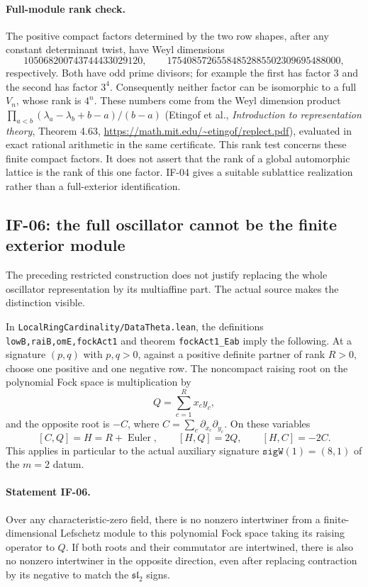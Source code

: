 \paragraph{Full-module rank check.}
The positive compact factors determined by the two row shapes, after
any constant determinant twist, have Weyl dimensions
\[
 105068200743744433029120,
 \qquad17540857265584852885502309695488000,
\]
respectively. Both have odd prime divisors; for example the first has
factor $3$ and the second has factor $3^4$. Consequently neither factor
can be isomorphic to a full $V_n$, whose rank is $4^n$. These numbers
come from the Weyl dimension product
$\prod_{a<b}(\lambda_a-\lambda_b+b-a)/(b-a)$ (Etingof et al.,
\emph{Introduction to representation theory}, Theorem 4.63,
\url{https://math.mit.edu/~etingof/replect.pdf}), evaluated in exact
rational arithmetic in the same certificate. This rank test concerns
these finite compact factors. It does not assert that the rank of a
global automorphic lattice is the rank of this one factor. IF-04 gives
a suitable sublattice realization rather than a full-exterior
identification.

\subsection{IF-06: the full oscillator cannot be the finite exterior module}
The preceding restricted construction does not justify replacing the
whole oscillator representation by its multiaffine part. The actual
source makes the distinction visible.

In \texttt{LocalRingCardinality/DataTheta.lean}, the definitions
\texttt{lowB,raiB,omE,fockAct1} and theorem
\texttt{fockAct1\_Eab} imply the following. At a signature $(p,q)$ with
$p,q>0$, against a positive definite partner of rank $R>0$, choose one
positive and one negative row. The noncompact raising root on the
polynomial Fock space is multiplication by
\[
 Q=\sum_{c=1}^R x_c y_c,
\]
and the opposite root is $-C$, where
$C=\sum_c\partial_{x_c}\partial_{y_c}$. On these variables
\[
 [C,Q]=H=R+\operatorname{Euler},\qquad [H,Q]=2Q,\qquad[H,C]=-2C.
\]
This applies in particular to the actual auxiliary signature
$\texttt{sigW}(1)=(8,1)$ of the $m=2$ datum.

\paragraph{Statement IF-06.}
Over any characteristic-zero field, there is no nonzero intertwiner
from a finite-dimensional Lefschetz module to this polynomial Fock
space taking its raising operator to $Q$. If both roots and their
commutator are intertwined, there is also no nonzero intertwiner in
the opposite direction, even after replacing contraction by its
negative to match the $\mathfrak{sl}_2$ signs.

